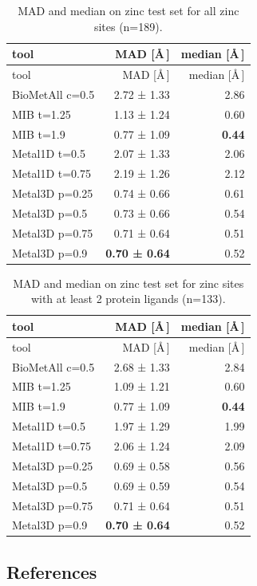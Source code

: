 \documentclass[ lineno,
  9pt]{elife}
\newenvironment{tablenos:tagged-table}[1][]{
  \let\oldthetable\thetable
  \let\oldtheHtable\theHtable
  \renewcommand{\thetable}{#1}
  \renewcommand{\theHtable}{#1}
}{
  \let\thetable\oldthetable
  \let\theHtable\oldtheHtable
  \addtocounter{table}{-1}
}
\begin{document}
\begin{tablenos:tagged-table}[S3]

\begin{longtable}[]{@{}lrr@{}}
\caption{MAD and median on zinc test set for all zinc sites (n=189). \label{tbl:compmadmediantest}}\tabularnewline
\toprule
tool & MAD {[}\AA\,{]} & median {[}\AA\,{]}\tabularnewline
\midrule
\endfirsthead
\toprule
tool & MAD {[}\AA\,{]} & median {[}\AA\,{]}\tabularnewline
\midrule
\endhead
BioMetAll c=0.5 & 2.72 ± 1.33 & 2.86\tabularnewline
MIB t=1.25 & 1.13 ± 1.24 & 0.60\tabularnewline
MIB t=1.9 & 0.77 ± 1.09 & \textbf{0.44}\tabularnewline
Metal1D t=0.5 & 2.07 ± 1.33 & 2.06\tabularnewline
Metal1D t=0.75 & 2.19 ± 1.26 & 2.12\tabularnewline
Metal3D p=0.25 & 0.74 ± 0.66 & 0.61\tabularnewline
Metal3D p=0.5 & 0.73 ± 0.66 & 0.54\tabularnewline
Metal3D p=0.75 & 0.71 ± 0.64 & 0.51\tabularnewline
Metal3D p=0.9 & \textbf{0.70 ± 0.64} & 0.52\tabularnewline
\bottomrule
\end{longtable}

\end{tablenos:tagged-table}

\begin{tablenos:tagged-table}[S4]

\begin{longtable}[]{@{}lrr@{}}
\caption{MAD and median on zinc test set for zinc sites with at least 2 protein ligands (n=133). \label{tbl:compmadmediantestgoodonly}}\tabularnewline
\toprule
tool & MAD {[}\AA\,{]} & median {[}\AA\,{]}\tabularnewline
\midrule
\endfirsthead
\toprule
tool & MAD {[}\AA\,{]} & median {[}\AA\,{]}\tabularnewline
\midrule
\endhead
BioMetAll c=0.5 & 2.68 ± 1.33 & 2.84\tabularnewline
MIB t=1.25 & 1.09 ± 1.21 & 0.60\tabularnewline
MIB t=1.9 & 0.77 ± 1.09 & \textbf{0.44}\tabularnewline
Metal1D t=0.5 & 1.97 ± 1.29 & 1.99\tabularnewline
Metal1D t=0.75 & 2.06 ± 1.24 & 2.09\tabularnewline
Metal3D p=0.25 & 0.69 ± 0.58 & 0.56\tabularnewline
Metal3D p=0.5 & 0.69 ± 0.59 & 0.54\tabularnewline
Metal3D p=0.75 & 0.71 ± 0.64 & 0.51\tabularnewline
Metal3D p=0.9 & \textbf{0.70 ± 0.64} & 0.52\tabularnewline
\bottomrule
\end{longtable}

\end{tablenos:tagged-table}


\clearpage
\newpage

\hypertarget{references}{%
\subsection{References}\label{references}}
\end{document}
